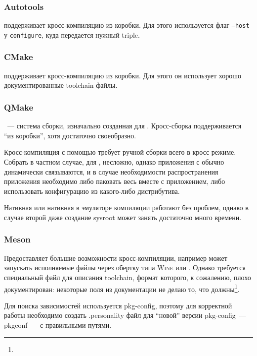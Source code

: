 \subsubsection{Autotools}

\autotools{} поддерживает кросс-компиляцию из коробки.
Для этого используется флаг \texttt{--host} у \texttt{configure}, куда передается нужный triple.

\subsubsection{CMake}

\cmake{} поддерживает кросс-компиляцию из коробки.
Для этого он использует хорошо документированные toolchain файлы.

\subsubsection{QMake}

\qmake{}~--- система сборки, изначально созданная для \qt{}.
Кросс-сборка поддерживается \enquote{из коробки}, хотя достаточно своеобразно.

Кросс-компиляция с помощью \qmake{} требует ручной сборки всего \qt{} в кросс режиме.
Собрать \qt{} в частном случае, для \ci{}, несложно, однако приложения с \qt{} обычно динамически связываются, и в случае необходимости распространения приложения необходимо либо паковать весь \qt{} вместе с приложением, либо использовать конфигурацию из какого-либо дистрибутива.

Нативная или нативная в эмуляторе компиляции работают без проблем, однако в случае второй даже создание sysroot может занять достаточно много времени.

\subsubsection{Meson}

Предоставляет большие возможности кросс-компиляции, например может запускать исполняемые файлы через обертку типа \textsc{Wine} или \qemu{}.
Однако требуется специальный файл для описания toolchain, формат которого, к сожалению, плохо документирован: некоторые поля из документации не делаю то, что должны\footnote{}.

Для поиска зависимостей используется pkg-config, поэтому для корректной работы необходимо создать .personality файл для \enquote{новой} версии pkg-config~--- pkgconf~--- с правильными путями.

